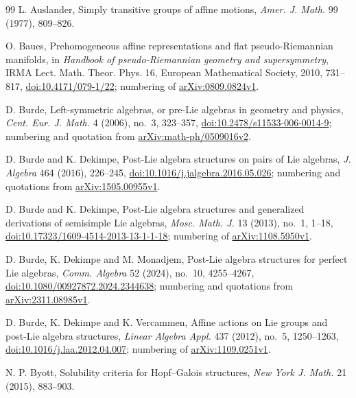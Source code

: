 \documentclass[11pt]{article}
\theoremstyle{definition}
\theoremstyle{remark}
\begin{document}
\begin{thebibliography}{99}
 L. Auslander, Simply transitive groups of affine motions,
\emph{Amer. J. Math.} 99 (1977), 809--826.

 O. Baues, Prehomogeneous affine representations and flat
pseudo-Riemannian manifolds, in \emph{Handbook of pseudo-Riemannian
geometry and supersymmetry}, IRMA Lect. Math. Theor. Phys. 16, European
Mathematical Society, 2010, 731--817,
\href{https://doi.org/10.4171/079-1/22}{doi:10.4171/079-1/22};
numbering of \href{https://arxiv.org/abs/0809.0824v1}{arXiv:0809.0824v1}.

 D. Burde, Left-symmetric algebras, or pre-Lie algebras in
geometry and physics, \emph{Cent. Eur. J. Math.} 4 (2006), no.~3,
323--357,
\href{https://doi.org/10.2478/s11533-006-0014-9}{doi:10.2478/s11533-006-0014-9};
numbering and quotation from
\href{https://arxiv.org/abs/math-ph/0509016v2}{arXiv:math-ph/0509016v2}.

 D. Burde and K. Dekimpe, Post-Lie algebra structures on
pairs of Lie algebras, \emph{J. Algebra} 464 (2016), 226--245,
\href{https://doi.org/10.1016/j.jalgebra.2016.05.026}{doi:10.1016/j.jalgebra.2016.05.026};
numbering and quotations from
\href{https://arxiv.org/abs/1505.00955v1}{arXiv:1505.00955v1}.

 D. Burde and K. Dekimpe, Post-Lie algebra structures and
generalized derivations of semisimple Lie algebras, \emph{Mosc. Math. J.}
13 (2013), no.~1, 1--18,
\href{https://doi.org/10.17323/1609-4514-2013-13-1-1-18}{doi:10.17323/1609-4514-2013-13-1-1-18};
numbering of \href{https://arxiv.org/abs/1108.5950v1}{arXiv:1108.5950v1}.

 D. Burde, K. Dekimpe and M. Monadjem, Post-Lie algebra
structures for perfect Lie algebras, \emph{Comm. Algebra} 52 (2024),
no.~10, 4255--4267,
\href{https://doi.org/10.1080/00927872.2024.2344638}{doi:10.1080/00927872.2024.2344638};
numbering and quotations from
\href{https://arxiv.org/abs/2311.08985v1}{arXiv:2311.08985v1}.

 D. Burde, K. Dekimpe and K. Vercammen, Affine actions on Lie
groups and post-Lie algebra structures, \emph{Linear Algebra Appl.} 437
(2012), no.~5, 1250--1263,
\href{https://doi.org/10.1016/j.laa.2012.04.007}{doi:10.1016/j.laa.2012.04.007};
numbering of \href{https://arxiv.org/abs/1109.0251v1}{arXiv:1109.0251v1}.

 N. P. Byott, Solubility criteria for Hopf--Galois
structures, \emph{New York J. Math.} 21 (2015), 883--903.


\end{thebibliography}
\end{document}
